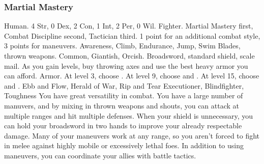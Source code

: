         \subsubsection{Martial Mastery}
             Human.
             4 Str, 0 Dex, 2 Con, 1 Int, 2 Per, 0 Wil.
             Fighter.
             Martial Mastery first, Combat Discipline second, Tactician third.
             1 point for an additional combat style, 3 points for maneuvers.
             Awareness, Climb, Endurance, Jump, Swim
             Blades, thrown weapons.
             Common, Giantish, Orcish.
             Broadsword, standard shield, scale mail. As you gain levels, buy throwing axes and use the best heavy armor you can afford.
             Armor.
                At level 3, choose .
                At level 9, choose  and .
                At level 15, choose  and .
             Ebb and Flow, Herald of War, Rip and Tear
             Executioner, Blindfighter, Toughness
             You have great versatility in combat.
            You have a large number of manuvers, and by mixing in thrown weapons and shouts, you can attack at multiple ranges and hit multiple defenses.
            When your shield is unnecessary, you can hold your broadsword in two hands to improve your already respectable damage.
            Many of your maneuvers work at any range, so you aren't forced to fight in melee against highly mobile or excessively lethal foes.
            In addition to using maneuvers, you can coordinate your allies with battle tactics.

